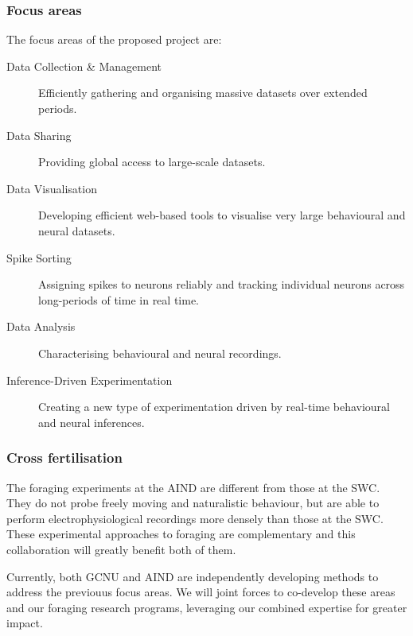 \subsubsection{Focus areas}

The focus areas of the proposed project are:

\begin{description}

    \item[Data Collection \& Management] Efficiently gathering and organising
        massive datasets over extended periods.

    \item[Data Sharing] Providing global access to large-scale datasets.

    \item[Data Visualisation] Developing efficient web-based tools to visualise
        very large behavioural and neural datasets.

    \item[Spike Sorting] Assigning spikes to neurons reliably and tracking
        individual neurons across long-periods of time in real time.

    \item[Data Analysis] Characterising behavioural and neural recordings.

    \item[Inference-Driven Experimentation] Creating a new type of
        experimentation driven by real-time behavioural and neural inferences.

\end{description}

\subsubsection{Cross fertilisation}

The foraging experiments at the AIND are different from those at the SWC. They
do not probe freely moving and naturalistic behaviour, but are able to perform
electrophysiological recordings more densely than those at the SWC.
%
These experimental approaches to foraging are complementary and this
collaboration will greatly benefit both of them.

Currently, both GCNU and AIND are independently developing methods to address
the previouus focus areas. We will joint forces to co-develop these areas and
our foraging research programs, leveraging our combined expertise for greater
impact.
